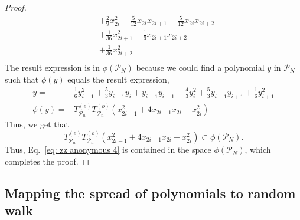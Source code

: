 \documentclass{article}
\newcommand{\Twhole}{T^{(\text{whole})}}
\newcommand{\supket}[1]{|#1 \rangle\rangle}
\begin{document}
\begin{proof}
\begin{equation}
\begin{aligned}
        & + \frac{2}{9}x_{2i}^2 + \frac{5}{12} x_{2i}x_{2i+1} + \frac{5}{12} x_{2i}x_{2i+2}\\
        & + \frac{1}{36}x_{2i+1}^2  + \frac{1}{9} x_{2i+1}x_{2i+2}\\
        & + \frac{1}{36}x_{2i+2}^2 \\
    \end{aligned}
    \end{equation}
    The result expression is in $\phi(\mathcal{P}_N)$ because we could find a polynomial $y$ in $\mathcal{P}_N$ such that $\phi(y)$ equals the result expression,
    \begin{align}
        y =& \frac{1}{6} y_{i-1}^2 + \frac{5}{3} y_{i-1}y_{i} + y_{i-1}y_{i+1} + \frac{4}{3} y_{i}^2 + \frac{5}{3} y_{i-1}y_{i+1}  + \frac{1}{6} y_{i+1}^2 \\
        \phi(y) =& T^{(e)}_{\mathcal{P}_n}T^{(o)}_{\mathcal{P}_n} ( x_{2i-1}^2+4 x_{2i-1} x_{2i}+x_{2i}^2)
    \end{align}
    Thus, we get that 
    \begin{equation}
        T^{(e)}_{\mathcal{P}_n}T^{(o)}_{\mathcal{P}_n} ( x_{2i-1}^2+4 x_{2i-1} x_{2i}+x_{2i}^2) \subset \phi(\mathcal{P}_N).
    \end{equation}
    Thus, Eq.~\eqref{eq: zz anonymous 4} is contained in the space $\phi(\mathcal{P}_N)$, which completes the proof.
\end{proof}



\subsection{Mapping the spread of polynomials to random walk}
\label{sec: mapping the action of tensors to random walk}
\end{document}
